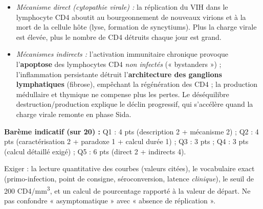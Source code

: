 \documentclass[11pt]{article}
\begin{document}
\begin{corrige}
\begin{enumerate}
    \begin{itemize}
        \item \emph{Mécanisme direct (cytopathie virale) :} la réplication du VIH dans le lymphocyte CD4 aboutit au bourgeonnement de nouveaux virions et à la mort de la cellule hôte (lyse, formation de syncytiums). Plus la charge virale est élevée, plus le nombre de CD4 détruits chaque jour est grand.
        \item \emph{Mécanismes indirects :} l'activation immunitaire chronique provoque l'\textbf{apoptose} des lymphocytes CD4 \emph{non infectés} (« bystanders ») ; l'inflammation persistante détruit l'\textbf{architecture des ganglions lymphatiques} (fibrose), empêchant la régénération des CD4 ; la production médullaire et thymique ne compense plus les pertes. Le déséquilibre destruction/production explique le déclin progressif, qui s'accélère quand la charge virale remonte en phase Sida.
    \end{itemize}
\end{enumerate}
\textbf{Barème indicatif (sur 20) :} Q1 : 4 pts (description 2 + mécanisme 2) ; Q2 : 4 pts (caractérisation 2 + paradoxe 1 + calcul durée 1) ; Q3 : 3 pts ; Q4 : 3 pts (calcul détaillé exigé) ; Q5 : 6 pts (direct 2 + indirects 4).
\begin{attention}
Exiger : la lecture quantitative des courbes (valeurs citées), le vocabulaire exact (primo-infection, point de consigne, séroconversion, latence \emph{clinique}), le seuil de 200 CD4/mm\textsuperscript{3}, et un calcul de pourcentage rapporté à la valeur de départ. Ne pas confondre « asymptomatique » avec « absence de réplication ».
\end{attention}
\end{corrige}
\end{document}
